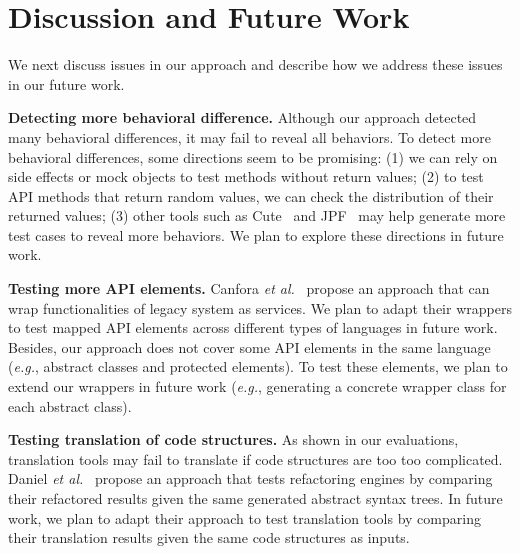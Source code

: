 

\section{Discussion and Future Work}
\label{sec:discuss}

We next discuss issues in our approach and describe how we address
these issues in our future work.

\textbf{Detecting more behavioral difference.} Although our approach detected many behavioral differences, it may fail to reveal all behaviors. To detect more behavioral differences, some directions seem to be promising: (1) we can rely on side effects or  mock objects to test methods without return values; (2) to test API methods that return random values, we can check the distribution of their returned values; (3) other tools such as Cute~\cite{koushik:cute} and JPF~\cite{visser2003mcp} may help generate more test cases to reveal more behaviors. We plan to explore these directions in future work.

\textbf{Testing more API elements.} Canfora \emph{et al.}~\cite{CanforaFFT08} propose an approach that can wrap functionalities of legacy system as services. We plan to adapt their wrappers to test mapped API elements across different types of languages in future work. Besides, our approach does not cover some API elements in the same language (\emph{e.g.}, abstract classes and protected elements). To test these elements, we plan to extend our wrappers in future work (\emph{e.g.}, generating a concrete wrapper class for each abstract class).

\textbf{Testing translation of code structures.} As shown in our evaluations, translation tools may fail to translate if code structures are too too complicated. Daniel \emph{et al.}~\cite{daniel2007automated} propose an approach that tests refactoring engines by comparing their refactored results given the same generated abstract syntax trees. In future work, we plan to adapt their approach to test translation tools by comparing their translation results given the same code structures as inputs.

